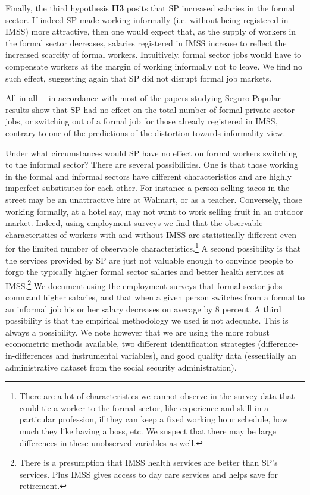 \documentclass[oneside,11pt]{article}
\begin{document}
Finally, the third hypothesis \textbf{H3} posits that SP increased salaries in the formal sector. If indeed SP made working informally (i.e. without being registered in IMSS) more attractive, then one would expect that, as the supply of workers in the formal sector decreases, salaries registered in IMSS increase to reflect the increased scarcity of formal workers. Intuitively, formal sector jobs would have to compensate workers at the margin of working informally not to leave. We find no such effect, suggesting again that SP did not disrupt formal job markets.

All in all ---in accordance with most of the papers studying Seguro Popular--- results show that SP had no effect on the total number of formal private sector jobs, or switching out of a formal job for those already registered in IMSS, contrary to one of the predictions of the distortion-towards-informality view.

Under what circumstances would SP have no effect on formal workers switching to the informal sector? There are several possibilities. One is that those working in the formal and informal sectors have different characteristics and are highly imperfect substitutes for each other. For instance a person selling tacos in the street may be an unattractive hire at Walmart, or as a teacher. Conversely, those working formally, at a hotel say, may not want to work selling fruit in an outdoor market. Indeed, using employment surveys we find that the observable characteristics of workers with and without IMSS are statistically different even for the limited number of observable characteristics.\footnote{There are a lot of characteristics we cannot observe in the survey data that could tie a worker to the formal sector, like experience and skill in a particular profession, if they can keep a fixed working hour schedule, how much they like having a boss, etc. We suspect that there may be large differences in these unobserved variables as well.} A second possibility is that the services provided by SP are just not valuable enough to convince people to forgo the typically higher formal sector salaries and better health services at IMSS.\footnote{There is a presumption that IMSS health services are better than SP's services. Plus IMSS gives access to day care services and helps save for retirement.} We document using the employment surveys that formal sector jobs command higher salaries, and that when a given person switches from a formal to an informal job his or her salary decreases on average by 8 percent. A third possibility is that the empirical methodology we used is not adequate. This is always a possibility. We note however that we are using the more robust econometric methods available, two different identification strategies (difference-in-differences and instrumental variables), and good quality data (essentially an administrative dataset from the social security administration). 
\end{document}

